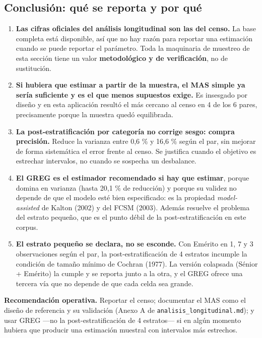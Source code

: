 \subsection{Conclusión: qué se reporta y por qué}
\label{sec:mues-conclusion}

\begin{enumerate}
  \item \textbf{Las cifras oficiales del análisis longitudinal son las del
        censo.} La base completa está disponible, así que no hay razón para
        reportar una estimación cuando se puede reportar el parámetro. Toda la
        maquinaria de muestreo de esta sección tiene un valor
        \textbf{metodológico y de verificación}, no de sustitución.
  \item \textbf{Si hubiera que estimar a partir de la muestra, el MAS simple ya
        sería suficiente y es el que menos supuestos exige.} Es insesgado por
        diseño y en esta aplicación resultó el más cercano al censo en 4 de los 6
        pares, precisamente porque la muestra quedó equilibrada.
  \item \textbf{La post-estratificación por categoría no corrige sesgo: compra
        precisión.} Reduce la varianza entre 0,6 \% y 16,6 \% según el par, sin
        mejorar de forma sistemática el error frente al censo. Se justifica cuando
        el objetivo es estrechar intervalos, no cuando se sospecha un desbalance.
  \item \textbf{El GREG es el estimador recomendado si hay que estimar}, porque
        domina en varianza (hasta 20,1 \% de reducción) y porque su validez no
        depende de que el modelo esté bien especificado: es la propiedad
        \emph{model-assisted} de Kalton (2002) y del FCSM (2003). Además resuelve
        el problema del estrato pequeño, que es el punto débil de la
        post-estratificación en este corpus.
  \item \textbf{El estrato pequeño se declara, no se esconde.} Con Emérito en 1,
        7 y 3 observaciones según el par, la post-estratificación de 4 estratos
        incumple la condición de tamaño mínimo de Cochran (1977). La versión
        colapsada (Sénior + Emérito) la cumple y se reporta junto a la otra, y el
        GREG ofrece una tercera vía que no depende de que cada celda sea grande.
\end{enumerate}

\textbf{Recomendación operativa.} Reportar el censo; documentar el MAS como el
diseño de referencia y su validación (Anexo A de
\texttt{analisis\_longitudinal.md}); y usar GREG ---no la post-estratificación de
4 estratos--- si en algún momento hubiera que producir una estimación muestral con
intervalos más estrechos.

